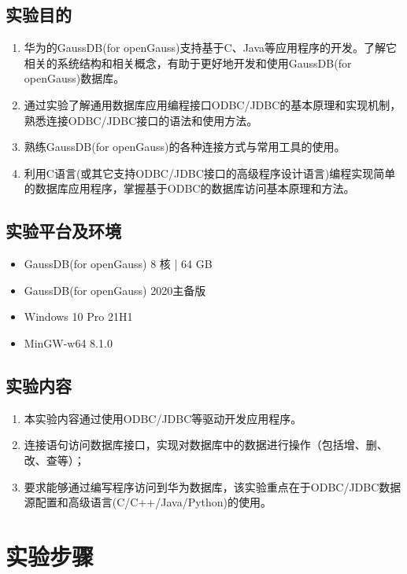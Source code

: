 \documentclass[lang=cn,11pt,a4paper,cite=authornum]{paper}
\begin{document}
\subsection{实验目的}

\begin{enumerate}
    \item 华为的GaussDB(for openGauss)支持基于C、Java等应用程序的开发。了解它相关的系统结构和相关概念，有助于更好地开发和使用GaussDB(for openGauss)数据库。
    \item 通过实验了解通用数据库应用编程接口ODBC/JDBC的基本原理和实现机制，熟悉连接ODBC/JDBC接口的语法和使用方法。
    \item 熟练GaussDB(for openGauss)的各种连接方式与常用工具的使用。
    \item 利用C语言(或其它支持ODBC/JDBC接口的高级程序设计语言)编程实现简单的数据库应用程序，掌握基于ODBC的数据库访问基本原理和方法。
\end{enumerate}

\subsection{实验平台及环境}

\begin{itemize}
    \item GaussDB(for openGauss) 8 核 | 64 GB
    \item GaussDB(for openGauss) 2020主备版
    \item Windows 10 Pro 21H1
    \item MinGW-w64 8.1.0
\end{itemize}

\subsection{实验内容}

\begin{enumerate}
    \item 本实验内容通过使用ODBC/JDBC等驱动开发应用程序。
    \item 连接语句访问数据库接口，实现对数据库中的数据进行操作（包括增、删、改、查等）；
    \item 要求能够通过编写程序访问到华为数据库，该实验重点在于ODBC/JDBC数据源配置和高级语言(C/C++/Java/Python)的使用。
\end{enumerate}

\section{实验步骤}
\end{document}
